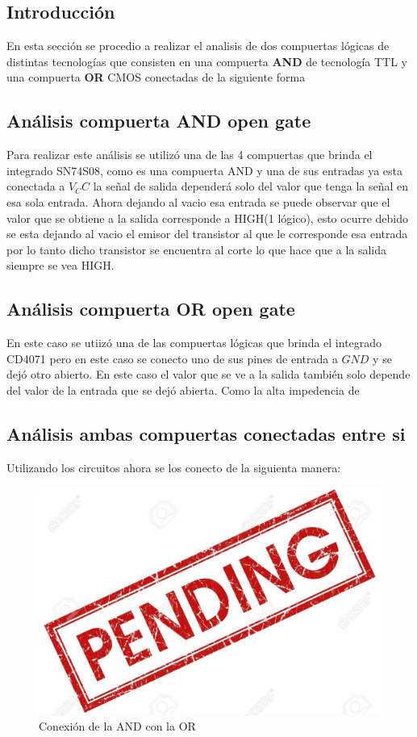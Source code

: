 \documentclass[a4paper]{article}
\begin{document}
\subsection{Introducción}
En esta sección se procedio a realizar el analisis de dos compuertas lógicas de distintas tecnologías que consisten en una compuerta \textbf{AND} de tecnología TTL y una compuerta \textbf{OR} CMOS conectadas de la siguiente forma

\subsection{Análisis compuerta AND open gate}
Para realizar este análisis se utilizó una de las 4 compuertas que brinda el integrado SN74S08, como es una compuerta AND y una de sus entradas ya esta conectada a $ V_CC $ la señal de salida dependerá solo del valor que tenga la señal en esa sola entrada. Ahora dejando al vacio esa entrada se puede observar que el valor que se obtiene a la salida corresponde a HIGH(1 lógico), esto ocurre debido se esta dejando al vacio el emisor del transistor al que le corresponde esa entrada por lo tanto dicho transistor se encuentra al corte lo que hace que a la salida siempre se vea HIGH.

\subsection{Análisis compuerta OR open gate}
En este caso se utiizó una de las compuertas lógicas que brinda el integrado CD4071 pero en este caso se conecto uno de sus pines de entrada a $ GND $ y se dejó otro abierto. En este caso el valor que se ve a la salida también solo depende del valor de la entrada que se dejó abierta. Como la alta impedencia de

\subsection{Análisis ambas compuertas conectadas entre si}
Utilizando los circuitos ahora se los conecto de la siguienta manera:
\begin{figure}[h]
    \centering
    \includegraphics{ImagenesEjercicio5/pend.jpg}
    \caption{Conexión de la AND con la OR}
\end{figure}
\end{document}
